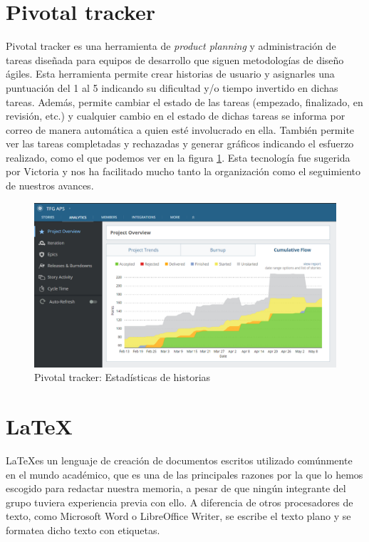 \documentclass[11pt]{book}
\begin{document}
\section{Pivotal tracker}
Pivotal tracker es una herramienta de \emph{product planning} y administración de tareas diseñada para equipos de desarrollo que siguen metodologías de diseño ágiles.
Esta herramienta permite crear historias de usuario y asignarles una puntuación del 1 al 5 indicando su dificultad y/o tiempo invertido en dichas tareas. Además, permite cambiar el estado de las tareas (empezado, finalizado, en revisión, etc.) y cualquier cambio en el estado de dichas tareas se informa por correo de manera automática a quien esté involucrado en ella.
También permite ver las tareas completadas y rechazadas y generar gráficos indicando el esfuerzo realizado, como el que podemos ver en la figura \ref{Figura 2}. Esta tecnología fue sugerida por Victoria y nos ha facilitado mucho tanto la organización como el seguimiento de nuestros avances.

\begin{figure}
	\centering
	\includegraphics[scale=0.6]{pivotal}
	\caption{Pivotal tracker: Estadísticas de historias}
	\label{Figura 2}
\end{figure}

\section{\LaTeX}
\LaTeX es un lenguaje de creación de documentos escritos utilizado comúnmente en el mundo académico, que es una de las principales razones por la que lo hemos escogido para redactar nuestra memoria, a pesar de que ningún integrante del grupo tuviera experiencia previa con ello. A diferencia de otros procesadores de texto, como Microsoft Word o LibreOffice Writer, se escribe el texto plano y se formatea dicho texto con etiquetas. 
\end{document}
